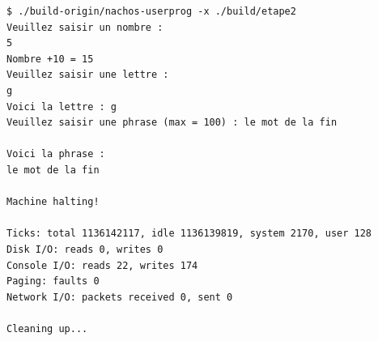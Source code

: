 \documentclass[a4paper,10pt]{article}
\begin{document}
\begin{lstlisting}
$ ./build-origin/nachos-userprog -x ./build/etape2
Veuillez saisir un nombre :
5
Nombre +10 = 15
Veuillez saisir une lettre :
g
Voici la lettre : g
Veuillez saisir une phrase (max = 100) : le mot de la fin

Voici la phrase :
le mot de la fin

Machine halting!

Ticks: total 1136142117, idle 1136139819, system 2170, user 128
Disk I/O: reads 0, writes 0
Console I/O: reads 22, writes 174
Paging: faults 0
Network I/O: packets received 0, sent 0

Cleaning up...
\end{lstlisting}
\end{document}
